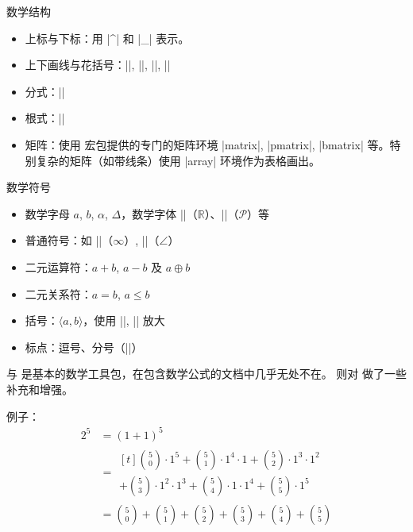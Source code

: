 \begin{frame}[fragile]{数学结构}
\begin{itemize}
\item 上标与下标：用 |^| 和 |_| 表示。
\item 上下画线与花括号：|\overline|, |\underline|, |\overbrace|, |\underbrace|
\item 分式：||
\item 根式：||
\item 矩阵：使用  宏包提供的专门的矩阵环境 |matrix|, |pmatrix|, |bmatrix| 等。特别复杂的矩阵（如带线条）使用 |array| 环境作为表格画出。
\end{itemize}
\end{frame}

\begin{frame}[fragile]{数学符号}
\begin{itemize}
\item 数学字母 $a$, $b$, $\alpha$, $\Delta$，数学字体 |\mathbb|（$\mathbb{R}$）、|\mathcal|（$\mathcal{P}$）等
\item 普通符号：如 |\infty|（$\infty$）, |\angle|（$\angle$）
\item 二元运算符：$a+b$, $a-b$ 及 $a\oplus b$
\item 二元关系符：$a=b$, $a\le b$
\item 括号：$\langle a, b\rangle$，使用 |\left|, |\right| 放大
\item 标点：逗号、分号（|\colon|）
\end{itemize}
\end{frame}


\begin{frame}[fragile]{ 与 }
 是基本的数学工具包，在包含数学公式的文档中几乎无处不在。 则对  做了一些补充和增强。\pause

例子：
\begin{align*}
2^5 &= (1+1)^5 \\
   &= \begin{multlined}[t]
      \binom50\cdot 1^5 + \binom51\cdot 1^4 \cdot 1
        + \binom52\cdot 1^3 \cdot 1^2 \\
      + \binom53\cdot 1^2 \cdot 1^3 + \binom54\cdot 1 \cdot 1^4
        + \binom55\cdot 1^5
    \end{multlined} \\
   &= \binom50 + \binom51 + \binom52 + \binom53
        + \binom54 + \binom55
\end{align*}
\end{frame}

